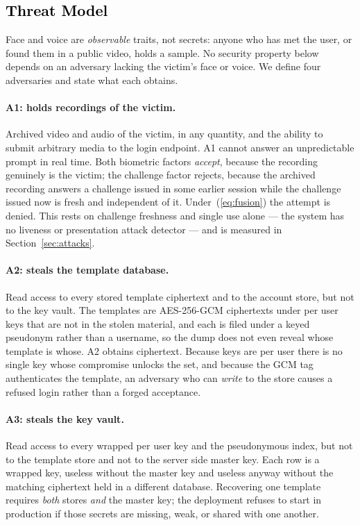 \documentclass[runningheads]{llncs}
\begin{document}
{\color{black}
\subsection{\textcolor{black}{Threat Model}}\label{sec:threat}
Face and voice are \emph{observable} traits, not secrets: anyone who has met the user, or found them in a public video, holds a sample. No security property below depends on an adversary lacking the victim's face or voice. We define four adversaries and state what each obtains.

\paragraph{A1: holds recordings of the victim.} Archived video and audio of the victim, in any quantity, and the ability to submit arbitrary media to the login endpoint. A1 cannot answer an unpredictable prompt in real time. Both biometric factors \emph{accept}, because the recording genuinely is the victim; the challenge factor rejects, because the archived recording answers a challenge issued in some earlier session while the challenge issued now is fresh and independent of it. Under~(\ref{eq:fusion}) the attempt is denied. This rests on challenge freshness and single use alone --- the system has no liveness or presentation attack detector --- and is measured in Section~\ref{sec:attacks}.

\paragraph{A2: steals the template database.} Read access to every stored template ciphertext and to the account store, but not to the key vault. The templates are AES-256-GCM ciphertexts under per user keys that are not in the stolen material, and each is filed under a keyed pseudonym rather than a username, so the dump does not even reveal whose template is whose. A2 obtains ciphertext. Because keys are per user there is no single key whose compromise unlocks the set, and because the GCM tag authenticates the template, an adversary who can \emph{write} to the store causes a refused login rather than a forged acceptance.

\paragraph{A3: steals the key vault.} Read access to every wrapped per user key and the pseudonymous index, but not to the template store and not to the server side master key. Each row is a wrapped key, useless without the master key and useless anyway without the matching ciphertext held in a different database. Recovering one template requires \emph{both} stores \emph{and} the master key; the deployment refuses to start in production if those secrets are missing, weak, or shared with one another.

}
\end{document}

